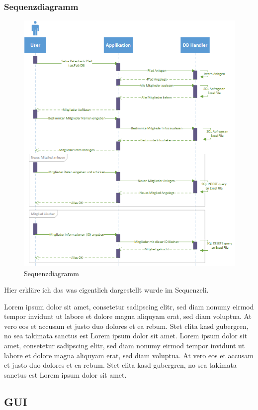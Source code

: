 \documentclass{article}
\begin{document}
\newpage

\subsubsection{Sequenzdiagramm}
\begin{figure}[h]
	\centering
	\includegraphics[width=0.8 \textwidth]{Sequenz-Diagramm_v1}
	\caption{Sequenzdiagramm}
\end{figure}

Hier erkläre ich das was eigentlich dargestellt wurde im Sequenzeli.

Lorem ipsum dolor sit amet, consetetur sadipscing elitr, sed diam nonumy eirmod tempor invidunt ut labore et dolore magna aliquyam erat, sed diam voluptua. At vero eos et accusam et justo duo dolores et ea rebum. Stet clita kasd gubergren, no sea takimata sanctus est Lorem ipsum dolor sit amet. Lorem ipsum dolor sit amet, consetetur sadipscing elitr, sed diam nonumy eirmod tempor invidunt ut labore et dolore magna aliquyam erat, sed diam voluptua. At vero eos et accusam et justo duo dolores et ea rebum. Stet clita kasd gubergren, no sea takimata sanctus est Lorem ipsum dolor sit amet.

\newpage


\subsection{GUI}
\end{document}
